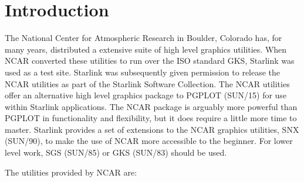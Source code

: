 \documentclass[twoside,11pt]{article}
\newcommand{\xref}[3]{#1}
\newcommand{\xlabel}[1]{}
\renewcommand{\_}{\texttt{\symbol{95}}}
\begin{document}

\section{\xlabel{introduction}Introduction}

The National Center for Atmospheric Research in Boulder, Colorado has,
for many years, distributed a extensive suite of high level graphics
utilities.  When NCAR converted these utilities to run over the ISO
standard GKS, Starlink was used as a test site.  Starlink was
subsequently given permission to release the NCAR utilities as part of
the Starlink Software Collection.  The NCAR utilities offer an
alternative high level graphics package to PGPLOT (\xref{SUN/15}{sun15}{}) 
for use
within Starlink applications.  The NCAR package is arguably more
powerful than PGPLOT in functionality and flexibility, but it does
require a little more time to master.  Starlink provides a set of
extensions to the NCAR graphics utilities, SNX (\xref{SUN/90}{sun90}{}), to make the
use of NCAR more accessible to the beginner.  For lower level work, SGS
(\xref{SUN/85}{sun85}{}) or GKS (\xref{SUN/83}{sun83}{}) should be used.

The utilities provided by NCAR are:
\end{document}
